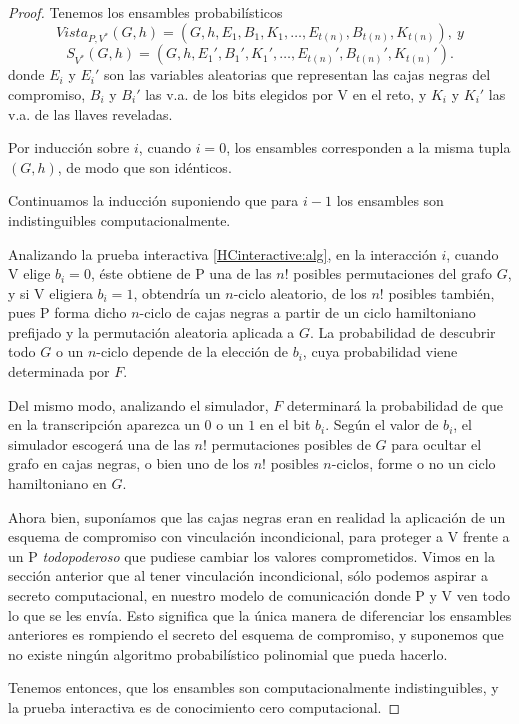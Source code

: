 \begin{proof}
	Tenemos los ensambles probabilísticos 
	\[Vista_{P,V^*}(G,h) = (G,h,E_1,B_1,K_1,\dots , E_{t(n)}, B_{t(n)}, K_{t(n)}),\ y \]
	\[S_{V^*}(G,h) = (G,h,E_1',B_1',K_1',\dots , E_{t(n)}', B_{t(n)}', K_{t(n)}').\]
	donde $E_i$ y $E_i'$ son las variables aleatorias que representan las cajas negras del compromiso, $B_i$ y $B_i'$ las v.a. de los bits elegidos por V en el reto, y $K_i$ y $K_i'$ las v.a. de las llaves reveladas.
	
	Por inducción sobre $i$, cuando $i=0$, los ensambles corresponden a la misma tupla $(G,h)$, de modo que son idénticos.
	
	Continuamos la inducción suponiendo que para $i-1$ los ensambles son indistinguibles computacionalmente. 
	
	Analizando la prueba interactiva \ref{HCinteractive:alg}, en la interacción $i$, cuando V elige $b_{i}=0$, éste obtiene de P una de las $n!$ posibles permutaciones del grafo $G$, y si V eligiera $b_i=1$, obtendría un $n$-ciclo aleatorio, de los $n!$ posibles también, pues P forma dicho $n$-ciclo de cajas negras a partir de un ciclo hamiltoniano prefijado y la permutación aleatoria aplicada a $G$. La probabilidad de descubrir todo $G$ o un $n$-ciclo depende de la elección de $b_i$, cuya probabilidad viene determinada por $F$.
	
	Del mismo modo, analizando el simulador,  $F$ determinará la probabilidad de que en la transcripción aparezca un $0$ o un $1$ en el bit $b_i$. Según el valor de $b_i$, el simulador escogerá una de las $n!$ permutaciones posibles de $G$ para ocultar el grafo en cajas negras, o bien uno de los $n!$ posibles $n$-ciclos, forme o no un ciclo hamiltoniano en $G$.
	
	Ahora bien, suponíamos que las cajas negras eran en realidad la aplicación de un esquema de compromiso con vinculación incondicional, para proteger a V frente a un P \textit{todopoderoso} que pudiese cambiar los valores comprometidos. Vimos en la sección anterior que al tener vinculación incondicional, sólo podemos aspirar a secreto computacional, en nuestro modelo de comunicación donde P y V ven todo lo que se les envía. Esto significa que la única manera de diferenciar los ensambles anteriores es rompiendo el secreto del esquema de compromiso, y suponemos que no existe ningún algoritmo probabilístico polinomial que pueda hacerlo.
	
	Tenemos entonces, que los ensambles son computacionalmente indistinguibles, y la prueba interactiva es de conocimiento cero computacional.
\end{proof}




